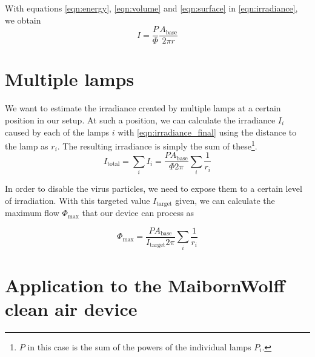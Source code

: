 \documentclass[12pt]{scrartcl}
\begin{document}
With equations \eqref{eqn:energy}, \eqref{eqn:volume} and \eqref{eqn:surface} in \eqref{eqn:irradiance}, we obtain
\begin{equation}
I =\frac{P }{\Phi } \frac{A_{\text{base}}}{2 \pi r }\label{eqn:irradiance_final}
\end{equation}


\section{Multiple lamps}\label{sect:multitube}
We want to estimate the irradiance created by multiple lamps at a certain position in our setup. At such a position, we can calculate the irradiance $I_i $ caused by each of the lamps $i$ with \eqref{eqn:irradiance_final} using the distance to the lamp as $r_{i}$. The resulting irradiance is simply the sum of these\footnote{$P$ in this case is the sum of the powers of the individual lamps $P_i$.}.
\begin{equation}
I_{\text{total}}=  \sum_{i} I_i = \frac{P A_{\text{base}}}{\Phi 2 \pi}  \sum_{i} \frac{1}{ r_i }
\end{equation}

In order to disable the virus particles, we need to expose them to a certain level of irradiation. With this targeted value $I_{\text{target}}$ given, we can calculate the maximum flow $\Phi_{\text{max}}$ that our device can process as

\begin{equation}
\Phi_{\text{max}}=  \frac{P A_{\text{base}}}{I_{\text{target}} 2 \pi}  \sum_{i} \frac{1}{ r_i }
\end{equation}

\section{Application to the MaibornWolff clean air device}
\end{document}
